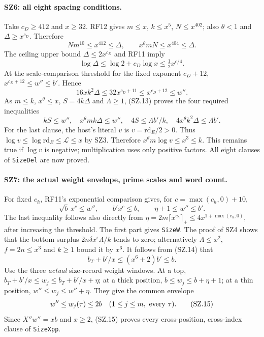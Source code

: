 \paragraph{SZ6: all eight spacing conditions.}
Take $c_D\geq412$ and $x\geq32$. RF12 gives
$m\leq x$, $k\leq x^5$, $N\leq x^{402}$; also
$\theta<1$ and $\Delta\geq x^{c_D}$. Therefore
\[
 Nm^{10}\leq x^{412}\leq\Delta,\qquad
 x^\theta mN\leq x^{404}\leq\Delta.
\]
The ceiling upper bound $\Delta\leq2x^{c_D}$ and RF11 imply
\[
        \log\Delta\leq\log2+c_D\log x
                                   \leq\tfrac12x^{\epsilon/4}.
                                                                    \tag{SZ.12}
\]
At the scale-comparison threshold for the fixed exponent $c_D+12$,
$x^{c_D+12}\leq w''\leq b'$. Hence
\[
             16xk^2\Delta
                    \leq32x^{c_D+11}\leq x^{c_D+12}\leq w''.
                                                                    \tag{SZ.13}
\]
As $m\leq k$, $x^\theta\leq x$, $S=4k\Delta$ and
$\Lambda\geq1$, (SZ.13) proves the four required inequalities
\[
 kS\leq w'',\quad x^\theta mk\Delta\leq w'',\quad
          4S\leq\Lambda b'/k,\quad
          4x^\theta k^2\Delta\leq\Lambda b'.
\]
For the last clause, the host's literal $v$ is
$v=\mathrm{rd}_E/2>0$. Thus $\log v\leq\log\mathrm{rd}_E
\leq\mathcal L\leq x$ by SZ3. Therefore
$x^\theta m\log v\leq x^3\leq k$. This remains true if
$\log v$ is negative; multiplication uses only positive factors.
All eight clauses of \texttt{SizeDel} are now proved.

\paragraph{SZ7: the actual weight envelope, prime scales and word count.}
For fixed $c_h$, RF11's exponential comparison gives, for
$c=\max(c_h,0)+10$,
\[
 \sqrt b\,x^c\leq w'',\qquad b'x^c\leq b,
       \qquad\eta+1\leq w''\leq b'.                           \tag{SZ.14}
\]
The last inequality follows also directly from
$\eta=2m\lceil x^{c_h}\rceil_+\leq4x^{1+\max(c_h,0)}$,
after increasing the threshold. The first part gives
\texttt{SizeW}. The proof of SZ4 shows that the bottom surplus
$2n\delta x^\epsilon\Lambda/k$ tends to zero; alternatively
$\Lambda\leq x^2$, $f=2n\leq x^3$ and $k\geq1$ bound it by
$x^6$. It follows from (SZ.14) that
\[
          b_T+b'/x\leq(x^6+2)b'\leq b.
\]
Use the three \emph{actual} size-record weight windows. At a top,
$b_T+b'/x\leq w_j\leq b_T+b'/x+\eta$; at a thick position,
$b\leq w_j\leq b+\eta+1$; at a thin position,
$w''\leq w_j\leq w''+\eta$. They give the common envelope
\[
               w''\leq w_j(\tau)\leq2b
             \quad(1\leq j\leq m,\ \hbox{every }\tau).       \tag{SZ.15}
\]
Since $X''w''=xb$ and $x\geq2$, (SZ.15) proves every
cross-position, cross-index clause of \texttt{SizeXpp}.

